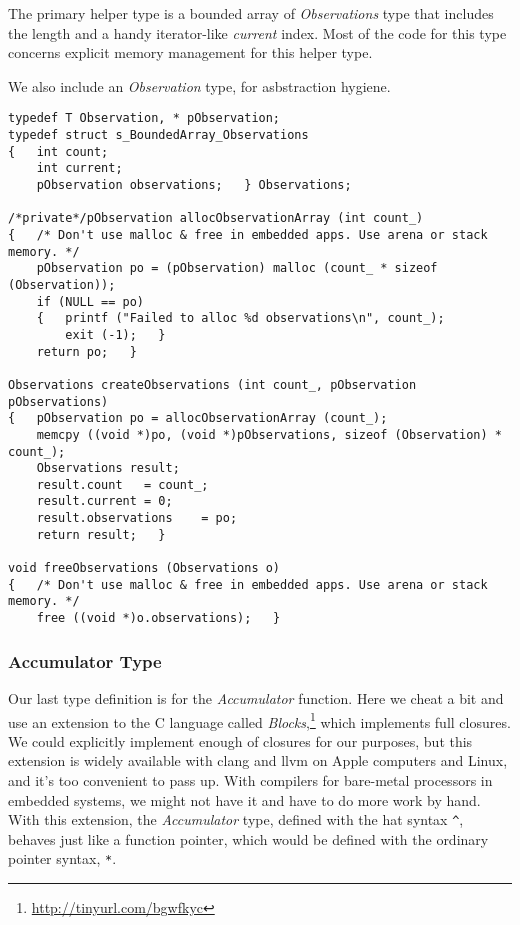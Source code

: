 \documentclass[10pt,oneside,x11names]{article}
\begin{document}
The primary helper type is a bounded array of \emph{Observations} type that includes
the length and a handy iterator-like \emph{current} index. Most of the code for this
type concerns explicit memory management for this helper type.

We also include an \emph{Observation} type, for asbstraction hygiene.

\begin{verbatim}
typedef T Observation, * pObservation;
typedef struct s_BoundedArray_Observations
{   int count;
    int current;
    pObservation observations;   } Observations;

/*private*/pObservation allocObservationArray (int count_)
{   /* Don't use malloc & free in embedded apps. Use arena or stack memory. */
    pObservation po = (pObservation) malloc (count_ * sizeof (Observation));
    if (NULL == po)
    {   printf ("Failed to alloc %d observations\n", count_);
        exit (-1);   }
    return po;   }

Observations createObservations (int count_, pObservation pObservations)
{   pObservation po = allocObservationArray (count_);
    memcpy ((void *)po, (void *)pObservations, sizeof (Observation) * count_);
    Observations result;
    result.count   = count_;
    result.current = 0;
    result.observations    = po;
    return result;   }

void freeObservations (Observations o)
{   /* Don't use malloc & free in embedded apps. Use arena or stack memory. */
    free ((void *)o.observations);   }
\end{verbatim}

\subsubsection{Accumulator Type}
\label{sec:orgheadline8}

Our last type definition is for the \emph{Accumulator} function. Here we cheat a bit
and use an extension to the C language called \emph{Blocks},\footnote{\url{http://tinyurl.com/bgwfkyc}} which
implements full closures. We could explicitly implement enough of closures for
our purposes, but this extension is widely available with clang and llvm on
Apple computers and Linux, and it's too convenient to pass up. With compilers
for bare-metal processors in embedded systems, we might not have it and have to
do more work by hand. With this extension, the \emph{Accumulator} type, defined with
the hat syntax \texttt{\textasciicircum{}}, behaves just like a function pointer, which would be defined
with the ordinary pointer syntax, \texttt{*}.
\end{document}
